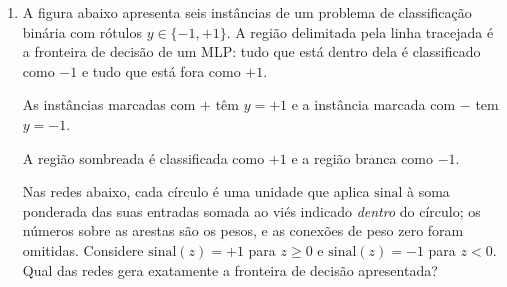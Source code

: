 \documentclass{dlproblemset}
\begin{document}
\begin{enumerate}[1)]
    \item A figura abaixo apresenta seis instâncias de um problema de classificação binária com rótulos $y \in \{-1, +1\}$. A região delimitada pela linha tracejada é a fronteira de decisão de um MLP: tudo que está dentro dela é classificado como $-1$ e tudo que está fora como $+1$.

    \begin{center}
    \end{center}

    \vspace{-0.7em}
    \centerline{\footnotesize As instâncias marcadas com $+$ têm $y = +1$ e a instância marcada com $-$ tem $y = -1$.}
    \centerline{\footnotesize A região sombreada é classificada como $+1$ e a região branca como $-1$.}

    Nas redes abaixo, cada círculo é uma unidade que aplica $\mathrm{sinal}$ à soma ponderada das suas entradas somada ao viés indicado \emph{dentro} do círculo; os números sobre as arestas são os pesos, e as conexões de peso zero foram omitidas. Considere $\mathrm{sinal}(z) = +1$ para $z \geq 0$ e $\mathrm{sinal}(z) = -1$ para $z < 0$. Qual das redes gera exatamente a fronteira de decisão apresentada?


\end{enumerate}
\end{document}
